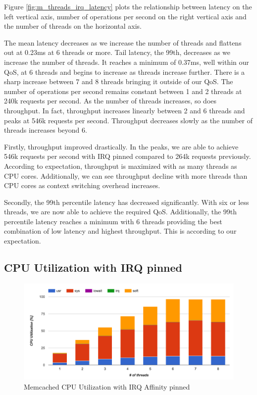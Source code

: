 Figure \ref{fig:m_threads_irq_latency} plots the relationship between latency on the left vertical axis, number of operations per second on the right vertical axis and the number of threads on the horizontal axis.

The mean latency decreases as we increase the number of threads and flattens out at 0.23ms at 6 threads or more. Tail latency, the 99th, decreases as we increase the number of threads. It reaches a minimum of 0.37ms, well within our QoS, at 6 threads and begins to increase as threads increase further. There is a sharp increase between 7 and 8 threads bringing it outside of our QoS. The number of operations per second remains constant between 1 and 2 threads at 240k requests per second. As the number of threads increases, so does throughput. In fact, throughput increases linearly between 2 and 6 threads and peaks at 546k requests per second. Throughput decreases slowly as the number of threads increases beyond 6.

Firstly, throughput improved drastically. In the peaks, we are able to achieve 546k requests per second with IRQ pinned compared to 264k requests previously. According to expectation, throughput is maximized with as many threads as CPU cores. Additionally, we can see throughput decline with more threads than CPU cores as context switching overhead increases.

Secondly, the 99th percentile latency has decreased significantly. With six or less threads, we are now able to achieve the required QoS. Additionally, the 99th percentile latency reaches a minimum with 6 threads providing the best combination of low latency and highest throughput. This is according to our expectation.

\subsection{CPU Utilization with IRQ pinned}

\begin{figure}[h]
    \includegraphics[width=\textwidth]{./res2/m_threads_irq_cpu.png}
    \caption{Memcached CPU Utilization with IRQ Affinity pinned}
    \label{fig:m_threads_irq_cpu}
\end{figure}

